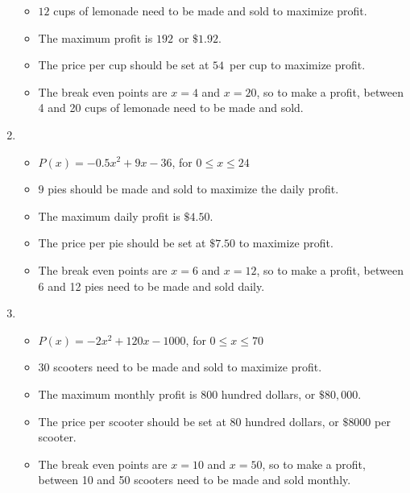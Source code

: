 \documentclass{ximera}
\begin{document}
\begin{enumerate}
\begin{itemize}
\item  $12$ cups of lemonade need to be made and sold to maximize profit.

\item  The maximum profit is $192$\textcent \, or $\$1.92$.

\item  The price per cup should be set at $54$\textcent \, per cup to maximize profit.

\item  The break even points are $x=4$ and $x=20$, so to make a profit, between 4 and 20 cups of lemonade need to be made and sold.


\end{itemize}


\item \begin{itemize}

\item $P(x) = -0.5 x^2+9x-36$, for $0 \leq x \leq 24$

\item  $9$ pies should be made and sold to maximize the daily profit.

\item The maximum daily profit is $\$4.50$.

\item  The price per pie should be set at $\$7.50$ to maximize profit.

\item  The break even points are $x=6$ and $x=12$, so to make a profit, between 6 and 12 pies  need to be made and sold daily.

\end{itemize}

\item \begin{itemize}

\item  $P(x) = -2x^2+120x-1000$, for $0 \leq x \leq 70$

\item  $30$ scooters need to be made and sold to maximize profit.

\item  The maximum monthly profit is $800$ hundred dollars, or $\$80,\!000$.

\item The price per scooter should be set at $80$ hundred dollars, or $\$8000$ per scooter.

\item  The break even points are $x=10$ and $x=50$, so to make a profit, between 10 and 50 scooters  need to be made and sold monthly.

\end{itemize}

\setcounter{HW}{\value{enumi}}
\end{enumerate}
\end{document}
